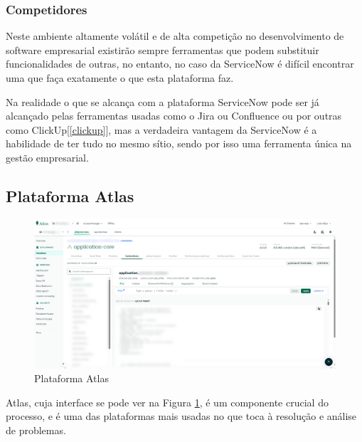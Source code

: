             \subsubsection{Competidores}\label{competidores-service-now} %
        
                Neste ambiente altamente volátil e de alta competição no desenvolvimento de software empresarial existirão sempre ferramentas que podem substituir funcionalidades de outras, no entanto, no caso da ServiceNow é difícil encontrar uma que faça exatamente o que esta plataforma faz. 
                
                Na realidade o que se alcança com a plataforma ServiceNow pode ser já alcançado pelas ferramentas usadas como o Jira ou Confluence ou por outras como ClickUp[\ref{clickup}], mas a verdadeira vantagem da ServiceNow é a habilidade de ter tudo no mesmo sítio, sendo por isso uma ferramenta única na gestão empresarial.

    \subsection{Plataforma Atlas}\label{sec:ferramentas-atlas}

        \begin{figure}[htbp]
            \centering
            \includegraphics[width=\textwidth]{imgs/MongoDB.png} %
            \caption{Plataforma Atlas}\label{fig:atlas-ui}
        \end{figure}

        Atlas, cuja interface se pode ver na Figura \ref{fig:atlas-ui}, é um componente crucial do processo, e é uma das plataformas mais usadas no que toca à resolução e análise de problemas.  
        
